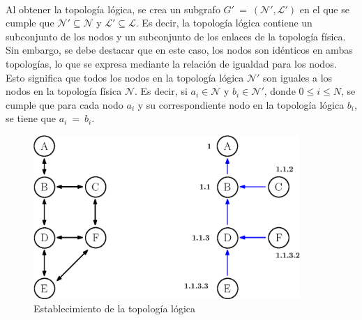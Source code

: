 \\
Al obtener la topología lógica, se crea un subgrafo $G' \: = \: (\mathcal{N}', \mathcal{L}')$ en el que se cumple que $\mathcal{N}' \subseteq \mathcal{N}$ y $\mathcal{L}' \subseteq \mathcal{L}$. Es decir, la topología lógica contiene un subconjunto de los nodos y un subconjunto de los enlaces de la topología física. Sin embargo, se debe destacar que en este caso, los nodos son idénticos en ambas topologías, lo que se expresa mediante la relación de igualdad para los nodos. Esto significa que todos los nodos en la topología lógica $\mathcal{N}'$ son iguales a los nodos en la topología física $\mathcal{N}$. Es decir, si $a_{i} \in \mathcal{N}$ y $b_{i} \in \mathcal{N}'$, donde $0 \leq i \leq N$, se cumple que para cada nodo $a_{i}$ y su correspondiente nodo en la topología lógica $b_{i}$, se tiene que $a_{i} \: = \: b_{i}$.
\begin{figure}[ht]
    \centering
    \includegraphics[width=0.9\textwidth]{archivos/img/dev/topo_logic.eps}
    \caption{Establecimiento de la topología lógica}
    \label{fig:topo_logic}
\end{figure}

